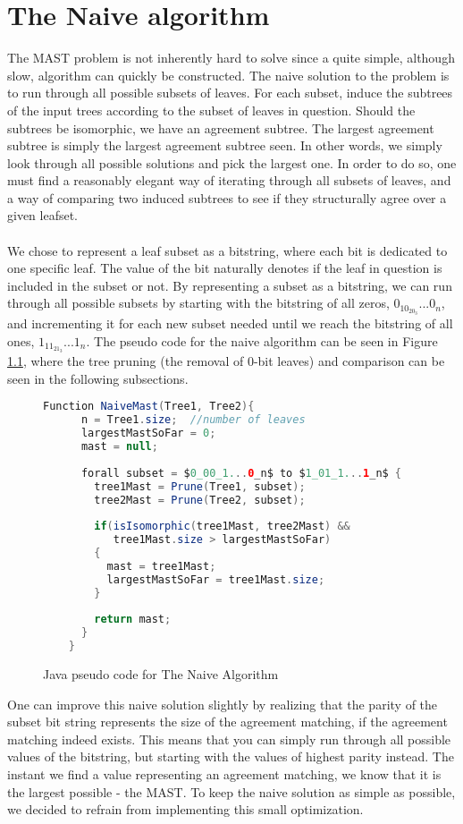 \chapter{The Naive algorithm}
The MAST problem is not inherently hard to solve since a quite simple, although slow, algorithm can quickly be constructed. The naive solution to the problem is to run through all possible subsets of leaves. For each subset, induce the subtrees of the input trees according to the subset of leaves in question. Should the subtrees be isomorphic, we have an agreement subtree. The largest agreement subtree is simply the largest agreement subtree seen. In other words, we simply look through all possible solutions and pick the largest one. In order to do so, one must find a reasonably elegant way of iterating through all subsets of leaves, and a way of comparing two induced subtrees to see if they structurally agree over a given leafset. 
\\
\\
We chose to represent a leaf subset as a bitstring, where each bit is dedicated to one specific leaf. The value of the bit naturally denotes if the leaf in question is included in the subset or not. By representing a subset as a bitstring, we can run through all possible subsets by starting with the bitstring of all zeros, $0_10_20_3...0_n$, and incrementing it for each new subset needed until we reach the bitstring of all ones, $1_11_21_3...1_n$. The pseudo code for the naive algorithm can be seen in Figure \ref{Code:Naive1}, where the tree pruning (the removal of 0-bit leaves) and comparison can be seen in the following subsections.

\begin{figure}
	\begin{lstlisting}[language=Java, mathescape]
	Function NaiveMast(Tree1, Tree2){
	  n = Tree1.size;  //number of leaves
	  largestMastSoFar = 0;
	  mast = null;
	  
	  forall subset = $0_00_1...0_n$ to $1_01_1...1_n$ {
	    tree1Mast = Prune(Tree1, subset);
	    tree2Mast = Prune(Tree2, subset);
	    
	    if(isIsomorphic(tree1Mast, tree2Mast) && 
	       tree1Mast.size > largestMastSoFar) 
	    {
	      mast = tree1Mast;
	      largestMastSoFar = tree1Mast.size;
	    }
	    
	    return mast;
	  }
	}
	\end{lstlisting}
	\caption{Java pseudo code for The Naive Algorithm}
	\label{Code:Naive1}
\end{figure}
One can improve this naive solution slightly by realizing that the parity of the subset bit string represents the size of the agreement matching, if the agreement matching indeed exists. This means that you can simply run through all possible values of the bitstring, but starting with the values of highest parity instead. The instant we find a value representing an agreement matching, we know that it is the largest possible - the MAST. To keep the naive solution as simple as possible, we decided to refrain from implementing this small optimization.

